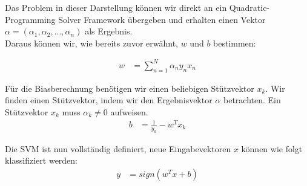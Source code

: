 \documentclass[a4paper,11pt,twoside]{scrreprt}
\begin{document}
Das Problem in dieser Darstellung können wir direkt an ein Quadratic-Programming Solver Framework übergeben und erhalten einen Vektor $\alpha = (\alpha_{1}, \alpha_{2}, ..., \alpha_{n})$ als Ergebnis. \\

Daraus können wir, wie bereits zuvor erwähnt, $w$ und $b$ bestimmen:

\begin{equation} \label{weights_calc_qp}
	\begin{aligned}
		w &= \sum_{n=1}^{N} \alpha_{n} y_{n} x_{n}
	\end{aligned}
\end{equation}

Für die Biasberechnung benötigen wir einen beliebigen Stützvektor $x_{k}$. Wir finden einen Stützvektor, indem wir den Ergebnisvektor $\alpha$ betrachten. Ein Stützvektor $x_{k}$ muss $\alpha_{k} \neq 0$ aufweisen.
\begin{equation} \label{bias_calc_qp}
	\begin{aligned}
		b &= \frac{1}{y_{k}} - w^{T} x_{k}
	\end{aligned}
\end{equation}

Die \ac{SVM} ist nun vollständig definiert, neue Eingabevektoren $x$ können wie folgt klassifiziert werden:
\begin{equation} \label{svm_classify}
	\begin{aligned}
		y &= sign(w^{T} x + b)
	\end{aligned}
\end{equation}


\nocite{*}

\clearpage
{}
{}
\printbibliography
\end{document}
